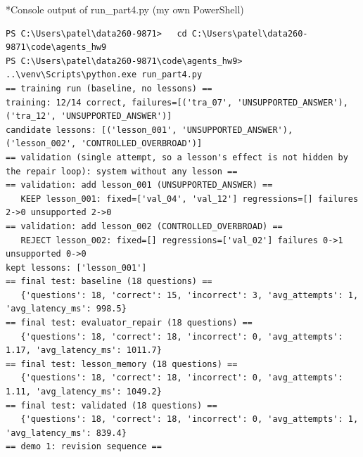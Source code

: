 \documentclass[11pt]{article}
\makeatletter
\renewcommand\subsection{\@startsection{subsection}{2}{\z@}{-2.2ex \@plus -1ex \@minus -.2ex}{0.8ex \@plus.2ex}{\normalfont\fontsize{12}{14.5}\selectfont\bfseries}}
\makeatother
\begin{document}
\subsection*{Console output of run\_part4.py (my own PowerShell)}
\begingroup\lstset{basicstyle=\ttfamily\tiny}
\begin{lstlisting}
PS C:\Users\patel\data260-9871>   cd C:\Users\patel\data260-9871\code\agents_hw9
PS C:\Users\patel\data260-9871\code\agents_hw9>   ..\venv\Scripts\python.exe run_part4.py
== training run (baseline, no lessons) ==
training: 12/14 correct, failures=[('tra_07', 'UNSUPPORTED_ANSWER'), ('tra_12', 'UNSUPPORTED_ANSWER')]
candidate lessons: [('lesson_001', 'UNSUPPORTED_ANSWER'), ('lesson_002', 'CONTROLLED_OVERBROAD')]
== validation (single attempt, so a lesson's effect is not hidden by the repair loop): system without any lesson ==
== validation: add lesson_001 (UNSUPPORTED_ANSWER) ==
   KEEP lesson_001: fixed=['val_04', 'val_12'] regressions=[] failures 2->0 unsupported 2->0
== validation: add lesson_002 (CONTROLLED_OVERBROAD) ==
   REJECT lesson_002: fixed=[] regressions=['val_02'] failures 0->1 unsupported 0->0
kept lessons: ['lesson_001']
== final test: baseline (18 questions) ==
   {'questions': 18, 'correct': 15, 'incorrect': 3, 'avg_attempts': 1, 'avg_latency_ms': 998.5}
== final test: evaluator_repair (18 questions) ==
   {'questions': 18, 'correct': 18, 'incorrect': 0, 'avg_attempts': 1.17, 'avg_latency_ms': 1011.7}
== final test: lesson_memory (18 questions) ==
   {'questions': 18, 'correct': 18, 'incorrect': 0, 'avg_attempts': 1.11, 'avg_latency_ms': 1049.2}
== final test: validated (18 questions) ==
   {'questions': 18, 'correct': 18, 'incorrect': 0, 'avg_attempts': 1, 'avg_latency_ms': 839.4}
== demo 1: revision sequence ==
\end{lstlisting}
\endgroup
\end{document}
